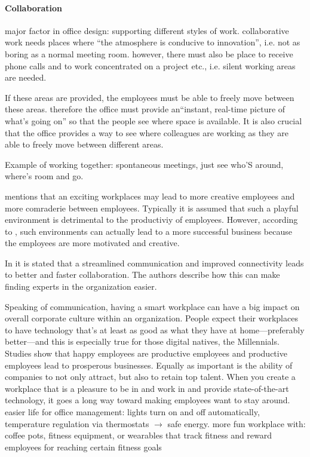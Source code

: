 \paragraph{Collaboration}
major factor in office design: supporting different styles of work. collaborative work needs places where ``the atmosphere is
conducive to innovation'', i.e. not as boring as a normal meeting room. however, there must also be place to receive phone calls and to work concentrated on a project etc., i.e. silent working areas are needed.\cite{tieto}

If these areas are provided, the employees must be able to freely move between these areas. therefore the office must provide an``instant, real-time picture of what's going on'' so that the people see where space is available. It is also crucial that the office provides a way to see where colleagues are working as they are able to freely move between different areas. \cite{tieto}

Example of working together: spontaneous meetings, just see who'S around, where's room and go. \cite{tieto}

\cite{roomzilla3} mentions that an exciting workplaces may lead to more creative employees and more comraderie between employees. Typically it is assumed that such a playful environment is detrimental to the productiviy of employees. However, according to \cite{metroffice}, such environments can actually lead to a more successful business because the employees are more motivated and creative.

In \cite{hbcommunications} it is stated that a streamlined communication and improved connectivity leads to better and faster collaboration. The authors describe how this can make finding experts in the organization easier.

Speaking of communication, having a smart workplace can have a big impact on overall corporate culture within an organization. People expect their workplaces to have technology that’s at least as good as what they have at home—preferably better—and this is especially true for those digital natives, the Millennials. Studies show that happy employees are productive employees and productive employees lead to prosperous businesses. Equally as important is the ability of companies to not only attract, but also to retain top talent. When you create a workplace that is a pleasure to be in and work in and provide state-of-the-art technology, it goes a long way toward making employees want to stay around. easier life for office management: lights turn on and off automatically, temperature regulation via thermostats \(\rightarrow\) safe energy. more fun workplace with: coffee pots, fitness equipment, or wearables that track fitness and reward employees for
reaching certain fitness goals\cite{hbcommunications}

